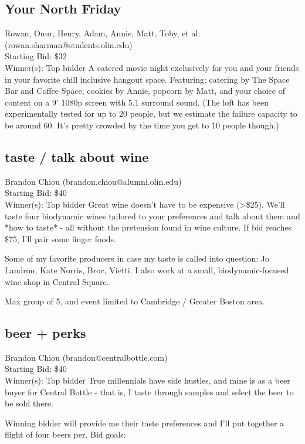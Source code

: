 \documentclass[11pt]{article}
\begin{document}
\subsection{Your North Friday}
Rowan, Onur, Henry, Adam, Annie, Matt, Toby, et al. (rowan.sharman@students.olin.edu) \\
Starting Bid: \$32 \\
Winner(s): 
Top bidder\newline
A catered movie night exclusively for you and your friends in your favorite chill inclusive hangout space. Featuring: catering by The Space Bar and Coffee Space, cookies by Annie, popcorn by Matt, and your choice of content on a 9' 1080p screen with 5.1 surround sound.
(The loft has been experimentally tested for up to 20 people, but we estimate the failure capacity to be around 60. It's pretty crowded by the time you get to 10 people though.)
\subsection{taste / talk about wine}
Brandon Chiou (brandon.chiou@alumni.olin.edu) \\
Starting Bid: \$40 \\
Winner(s): 
Top bidder\newline
Great wine doesn't have to be expensive (\textgreater \$25). We'll taste four biodynamic wines tailored to your preferences and talk about them and *how to taste* - all without the pretension found in wine culture. If bid reaches \$75, I'll pair some finger foods.

Some of my favorite producers in case my taste is called into question: Jo Landron, Kate Norris, Broc, Vietti. I also work at a small, biodynamic-focused wine shop in Central Square.

Max group of 5, and event limited to Cambridge / Greater Boston area.
\subsection{beer + perks}
Brandon Chiou (brandon@centralbottle.com) \\
Starting Bid: \$40 \\
Winner(s): 
Top bidder\newline
True millennials have side hustles, and mine is as a beer buyer for Central Bottle - that is, I taste through samples and select the beer to be sold there.

Winning bidder will provide me their taste preferences and I'll put together a flight of four beers per. Bid goals:
\end{document}
